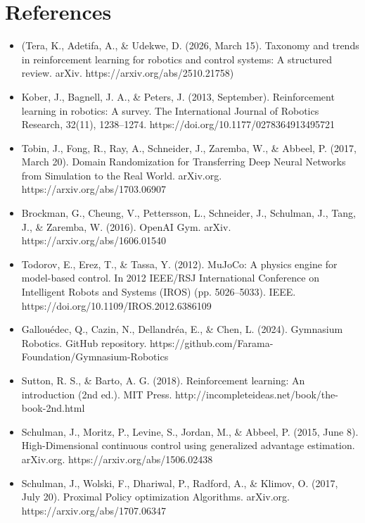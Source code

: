 \section*{References}

\begin{itemize}
    \item (Tera, K., Adetifa, A., \& Udekwe, D. (2026, March 15). Taxonomy and trends in reinforcement learning for robotics and control systems: A structured review. arXiv. https://arxiv.org/abs/2510.21758)

    \item Kober, J., Bagnell, J. A., \& Peters, J. (2013, September). Reinforcement learning in robotics: A survey. The International Journal of Robotics Research, 32(11), 1238--1274. https://doi.org/10.1177/0278364913495721

    \item Tobin, J., Fong, R., Ray, A., Schneider, J., Zaremba, W., \& Abbeel, P. (2017, March 20). Domain Randomization for Transferring Deep Neural Networks from Simulation to the Real World. arXiv.org. https://arxiv.org/abs/1703.06907

    \item Brockman, G., Cheung, V., Pettersson, L., Schneider, J., Schulman, J., Tang, J., \& Zaremba, W. (2016). OpenAI Gym. arXiv. https://arxiv.org/abs/1606.01540

    \item Todorov, E., Erez, T., \& Tassa, Y. (2012). MuJoCo: A physics engine for model-based control. In 2012 IEEE/RSJ International Conference on Intelligent Robots and Systems (IROS) (pp. 5026--5033). IEEE. https://doi.org/10.1109/IROS.2012.6386109

    \item Gallouédec, Q., Cazin, N., Dellandréa, E., \& Chen, L. (2024). Gymnasium Robotics. GitHub repository. https://github.com/Farama-Foundation/Gymnasium-Robotics

    \item Sutton, R. S., \& Barto, A. G. (2018). Reinforcement learning: An introduction (2nd ed.). MIT Press. http://incompleteideas.net/book/the-book-2nd.html

    \item Schulman, J., Moritz, P., Levine, S., Jordan, M., \& Abbeel, P. (2015, June 8). High-Dimensional continuous control using generalized advantage estimation. arXiv.org. https://arxiv.org/abs/1506.02438

    \item Schulman, J., Wolski, F., Dhariwal, P., Radford, A., \& Klimov, O. (2017, July 20). Proximal Policy optimization Algorithms. arXiv.org. https://arxiv.org/abs/1707.06347


\end{itemize}
